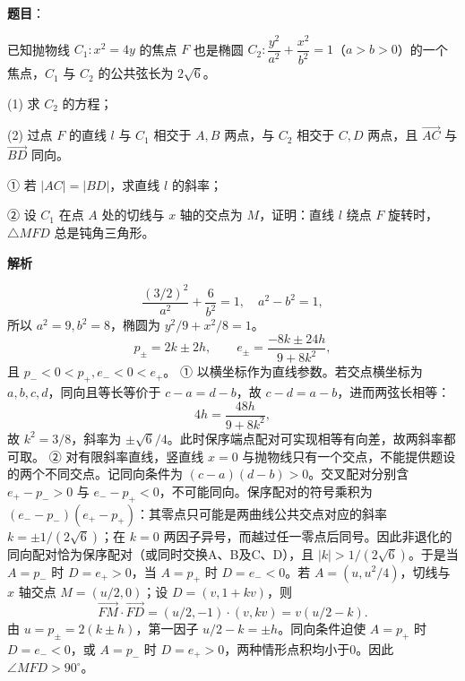 \begin{answer}

\textbf{题目}：

已知抛物线 \(C_1:x^2=4y\) 的焦点 \(F\) 也是椭圆 \(C_2:\dfrac{y^2}{a^2}+\dfrac{x^2}{b^2}=1\)（\(a>b>0\)）的一个焦点，\(C_1\) 与 \(C_2\) 的公共弦长为 \(2\sqrt6\)。

(1) 求 \(C_2\) 的方程；

(2) 过点 \(F\) 的直线 \(l\) 与 \(C_1\) 相交于 \(A,B\) 两点，与 \(C_2\) 相交于 \(C,D\) 两点，且 \(\overrightarrow{AC}\) 与 \(\overrightarrow{BD}\) 同向。

① 若 \(\lvert AC\rvert=\lvert BD\rvert\)，求直线 \(l\) 的斜率；

② 设 \(C_1\) 在点 \(A\) 处的切线与 \(x\) 轴的交点为 \(M\)，证明：直线 \(l\) 绕点 \(F\) 旋转时，\(\triangle MFD\) 总是钝角三角形。

\textbf{解析}

\nopagebreak[4]
\[
\frac{(3/2)^2}{a^2}+\frac6{b^2}=1,\quad a^2-b^2=1,
\]
所以 \(a^2=9,b^2=8\)，椭圆为 \(y^2/9+x^2/8=1\)。
\nopagebreak[4]
\[
p_\pm=2k\pm2h,\qquad e_\pm=\frac{-8k\pm24h}{9+8k^2},
\]
且 \(p_-<0<p_+,e_-<0<e_+\)。
① 以横坐标作为直线参数。若交点横坐标为 \(a,b,c,d\)，同向且等长等价于 \(c-a=d-b\)，故 \(c-d=a-b\)，进而两弦长相等：
\nopagebreak[4]
\[
4h=\frac{48h}{9+8k^2},
\]
故 \(k^2=3/8\)，斜率为 \(\pm\sqrt6/4\)。此时保序端点配对可实现相等有向差，故两斜率都可取。
② 对有限斜率直线，竖直线 \(x=0\) 与抛物线只有一个交点，不能提供题设的两个不同交点。记同向条件为 \((c-a)(d-b)>0\)。交叉配对分别含 \(e_+-p_->0\) 与 \(e_--p_+<0\)，不可能同向。保序配对的符号乘积为 \((e_--p_-)(e_+-p_+)\)：其零点只可能是两曲线公共交点对应的斜率 \(k=\pm1/(2\sqrt6)\)；在 \(k=0\) 两因子异号，而越过任一零点后同号。因此非退化的同向配对恰为保序配对（或同时交换A、B及C、D），且 \(|k|>1/(2\sqrt6)\)。于是当 \(A=p_-\) 时 \(D=e_+>0\)，当 \(A=p_+\) 时 \(D=e_-<0\)。若 \(A=(u,u^2/4)\)，切线与 \(x\) 轴交点 \(M=(u/2,0)\)；设 \(D=(v,1+kv)\)，则
\nopagebreak[4]
\[
\vec{FM}\cdot\vec{FD}=(u/2,-1)\cdot(v,kv)=v(u/2-k).
\]
由 \(u=p_\pm=2(k\pm h)\)，第一因子 \(u/2-k=\pm h\)。同向条件迫使 \(A=p_+\) 时 \(D=e_-<0\)，或 \(A=p_-\) 时 \(D=e_+>0\)，两种情形点积均小于0。因此 \(\angle MFD>90^\circ\)。



\end{answer}
